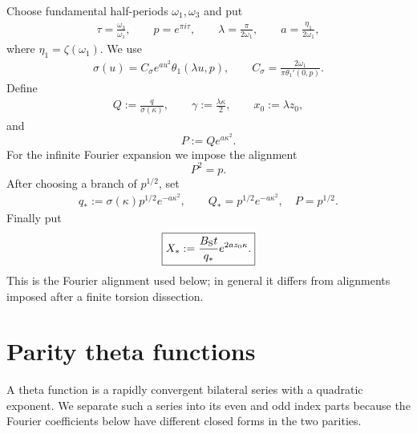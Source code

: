 \documentclass[11pt]{article}
\numberwithin{equation}{section}
\begin{document}
Choose fundamental half-periods $\omega_1,\omega_3$ and put
\begin{equation}
\begin{aligned}
\tau=\frac{\omega_3}{\omega_1},\qquad
p=e^{\pi i\tau},\qquad
\lambda=\frac{\pi}{2\omega_1},\qquad
a=\frac{\eta_1}{2\omega_1},
\end{aligned}
\end{equation}
where $\eta_1=\zeta(\omega_1)$. We use
\begin{equation}
\begin{aligned}
\boxed{\sigma(u)=C_\sigma e^{au^2}\theta_1(\lambda u,p)},
\qquad
\boxed{C_\sigma=\frac{2\omega_1}{\pi\theta_1'(0,p)}}.
\end{aligned}
\end{equation}
Define
\begin{equation}
\begin{aligned}
Q:=\frac{q}{\sigma(\kappa)},\qquad
\gamma:=\frac{\lambda\kappa}{2},\qquad
x_0:=\lambda z_0,
\end{aligned}
\end{equation}
and
\begin{equation}
P:=Qe^{a\kappa^2}.
\end{equation}
For the infinite Fourier expansion we impose the alignment
\begin{equation}
\boxed{P^2=p.}
\end{equation}
After choosing a branch of $p^{1/2}$, set
\begin{equation}
\begin{aligned}
\boxed{q_\ast:=\sigma(\kappa)p^{1/2}e^{-a\kappa^2}},
\qquad
\boxed{Q_\ast=p^{1/2}e^{-a\kappa^2},\quad P=p^{1/2}}.
\end{aligned}
\end{equation}
Finally put
\begin{equation}
\boxed{X_\ast:=\frac{B_{\rm S}t}{q_\ast}e^{2az_0\kappa}.}
\end{equation}
This is the Fourier alignment used below; in general it differs from alignments imposed after a finite torsion dissection.

\section{Parity theta functions}
A theta function is a rapidly convergent bilateral series with a quadratic exponent.  We separate such a series into its even and odd index parts because the Fourier coefficients below have different closed forms in the two parities.
\end{document}
